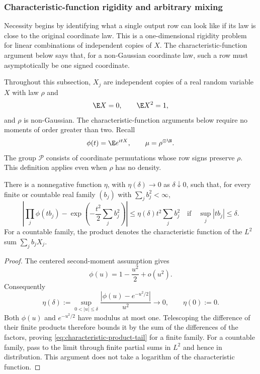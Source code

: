 \subsubsection{Characteristic-function rigidity and arbitrary mixing}
\label{sec:characteristic-function-rigidity}

Necessity begins by identifying what a single output row can look like if
its law is close to the original coordinate law.
This is a one-dimensional rigidity problem for linear combinations of
independent copies of \(X\).
The characteristic-function argument below says that, for a non-Gaussian
coordinate law, such a row must asymptotically be one signed coordinate.

Throughout this subsection, $X_j$ are independent copies of a real random
variable $X$ with law $\rho$ and
\[
  \E X=0,\qquad \E X^2=1,
\]
and $\rho$ is non-Gaussian.  The characteristic-function arguments
below require no moments of order greater than two.  Recall
\[
  \phi(t)=\E e^{itX},\qquad \mu=\rho^{\otimes\N}.
\]
The group $\mathcal P$ consists of coordinate permutations whose row
signs preserve $\rho$.  This definition applies even when $\rho$ has
no density.

\begin{lemma}
\label{lem:characteristic-product-tail}
There is a nonnegative function $\eta$, with $\eta(\delta)\to0$ as
$\delta\downarrow0$, such that, for every finite or countable real family
$(b_j)$ with $\sum_j b_j^2<\infty$,
\begin{equation}
 \left|\prod_j\phi(tb_j)
       -\exp\!\left(-\frac{t^2}{2}\sum_jb_j^2\right)\right|
 \leq \eta(\delta)t^2\sum_jb_j^2
 \quad\text{if}\quad \sup_j|tb_j|\leq\delta.
 \label{eq:characteristic-product-tail}
\end{equation}
For a countable family, the product denotes the characteristic function
of the $L^2$ sum $\sum_jb_jX_j$.
\end{lemma}
\begin{proof}
The centered second-moment assumption gives
\[
 \phi(u)=1-\frac{u^2}{2}+o(u^2).
\]
Consequently
\[
 \eta(\delta):=
 \sup_{0<|u|\leq\delta}
 \frac{|\phi(u)-e^{-u^2/2}|}{u^2}
 \longrightarrow0,\qquad \eta(0):=0.
\]
Both $\phi(u)$ and $e^{-u^2/2}$ have modulus at most one.  Telescoping
the difference of their finite products therefore bounds it by the sum
of the differences of the factors, proving
\eqref{eq:characteristic-product-tail} for a finite family.
For a countable family, pass to the limit through finite partial sums in
$L^2$ and hence in distribution.  This argument does not take a logarithm
of the characteristic function.
\end{proof}

